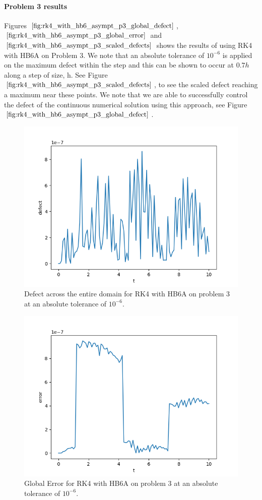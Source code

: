 \paragraph{Problem 3 results}
Figures $\ref{fig:rk4_with_hb6_asympt_p3_global_defect}$, $\ref{fig:rk4_with_hb6_asympt_p3_global_error}$ and $\ref{fig:rk4_with_hb6_asympt_p3_scaled_defects}$ shows the results of using RK4 with HB6A on Problem 3. We note that an absolute tolerance of $10^{-6}$ is applied on the maximum defect within the step and this can be shown to occur at $0.7h$ along a step of size, h. See Figure $\ref{fig:rk4_with_hb6_asympt_p3_scaled_defects}$, to see the scaled defect reaching a maximum near these points. We note that we are able to successfully control the defect of the continuous numerical solution using this approach, see Figure $\ref{fig:rk4_with_hb6_asympt_p3_global_defect}$. 


\begin{figure}[H]
\centering
\includegraphics[width=0.7\linewidth]{./figures/rk4_with_hb6_asympt_p3_global_defect}
\caption{Defect across the entire domain for RK4 with HB6A on problem 3 at an absolute tolerance of $10^{-6}$.}
\label{fig:rk4_with_hb6_asympt_p3_global_defect}
\end{figure}

\begin{figure}[H]
\centering
\includegraphics[width=0.7\linewidth]{./figures/rk4_with_hb6_asympt_p3_global_error}
\caption{Global Error for RK4 with HB6A on problem 3 at an absolute tolerance of $10^{-6}$.}
\label{fig:rk4_with_hb6_asympt_p3_global_error}
\end{figure}

